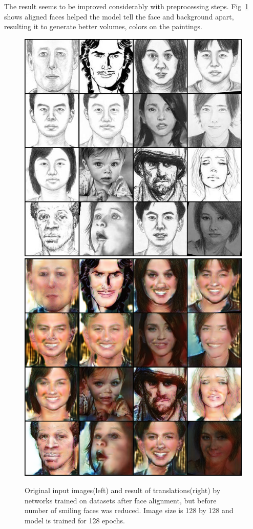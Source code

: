 The result seems to be improved considerably with preprocessing steps. Fig~\ref{FIG:smile} shows aligned faces helped the model tell the face and background apart, resulting it to generate better volumes, colors on the paintings. 

\begin{figure}[ht]
    \begin{center}
    \includegraphics[scale=0.32]{Graphics/smiling_input.png}
    \includegraphics[scale=0.32]{Graphics/smiling_output.png}
    \end{center}
    \caption{Original input images(left) and result of translations(right) by networks trained on datasets after face alignment, but before number of smiling faces was reduced. Image size is 128 by 128 and model is trained for 128 epochs.}\label{FIG:smile}
\end{figure}

